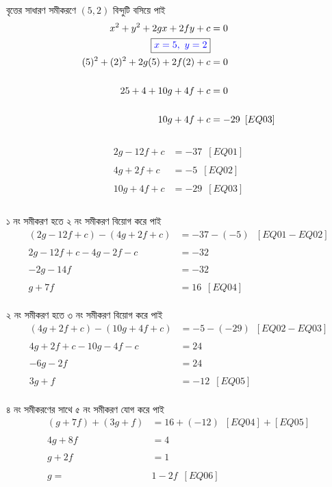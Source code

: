 \documentclass{article}
\begin{document}
	বৃত্তের সাধারণ সমীকরণে $(5,2)$ বিন্দুটি বসিয়ে পাই  \\ 
\begin{align*}
		x^2+y^2+2gx+2fy+c&=0\\
		\boxed{\textcolor{blue}{x=5,\,\,y=2}}&\\
	(5)^2+(2)^2+2g(5)+2f(2)+c&=0\\
	\\
25+4+10g+4f+c&=0\\
	\\
10g+4f+c&=-29\,\,\,[EQ03]\\
\end{align*}
\\
\begin{align*}
	2g-12f+c&=-37\,\,\,[EQ01]\\
	\\
		4g+2f+c&=-5\,\,\,[EQ02]\\
		\\
		10g+4f+c&=-29\,\,\,[EQ03]\\
\end{align*}
\\
১ নং সমীকরণ হতে ২ নং সমীকরণ বিয়োগ করে পাই\\ 
\begin{align*}
	(2g-12f+c)-(4g+2f+c)&=-37-(-5)\,\,\,\,[EQ01-EQ02]\\
	\\
2g-12f+c-4g-2f-c&=-32\\ 
	\\
-2g-14f&=-32\\
\\
g+7f&=16\,\,\,[EQ04]
\end{align*}
\\
২ নং সমীকরণ হতে ৩ নং সমীকরণ বিয়োগ করে পাই\\ 
\begin{align*}
(4g+2f+c)-(	10g+4f+c)&=-5-(-29)\,\,\,[EQ02-EQ03]\\
	\\
	4g+2f+c-10g-4f-c&=24\\
	\\
-6g-2f&=24\\
\\
3g+f&=-12\,\,\,[EQ05]
\end{align*}
\\
৪ নং সমীকরণের সাথে ৫ নং সমীকরণ যোগ করে পাই \\ 
\begin{align*}
(g+7f)+(3g+f)&=16+(-12)\,\,\,[EQ04]+[EQ05]\\
	\\
4g+8f&=4\\
	\\
g+2f&=1\\ 
\\
g=&1-2f\,\,\,[EQ06]
\end{align*}
\end{document}
